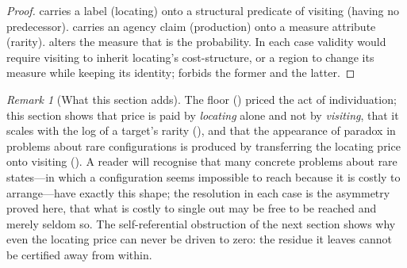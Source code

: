 \documentclass[11pt,twocolumn,a4paper]{article}
\theoremstyle{thmstyle}
\theoremstyle{definition}
\theoremstyle{remark}
\newtheorem{remark}[theorem]{Remark}
\begin{document}
\begin{proof}
 carries a label (locating) onto a structural predicate of
visiting (having no predecessor).  carries an agency claim
(production) onto a measure attribute (rarity).  alters
the measure that is the probability. In each case validity would require visiting
to inherit locating's cost-structure, or a region to change its measure while
keeping its identity;  forbids the former and
 the latter.
\end{proof}

\begin{remark}[What this section adds]
\label{rem:locating-adds}
The floor () priced the act of individuation; this
section shows that price is paid by \emph{locating} alone and not by
\emph{visiting}, that it scales with the log of a target's rarity
(), and that the appearance of paradox in problems about
rare configurations is produced by transferring the locating price onto visiting
(). A reader will recognise that many concrete problems about
rare states---in which a configuration seems impossible to reach because it is
costly to arrange---have exactly this shape; the resolution in each case is the
asymmetry proved here, that what is costly to single out may be free to be reached
and merely seldom so. The self-referential obstruction of the next section shows
why even the locating price can never be driven to zero: the residue it leaves
cannot be certified away from within.
\end{remark}
\end{document}
